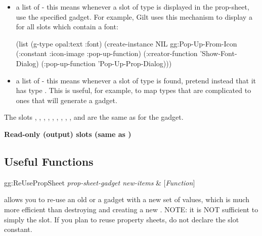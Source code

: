 \begin{description}
\begin{itemize}
\item 
a list of  - this means whenever a slot of type
 is displayed in the prop-sheet, use the specified gadget.
For example, Gilt uses this mechanism to display a
 for all slots which contain a font:
\begin{programexample}
(list (g-type opal:text :font)
      (create-instance NIL gg:Pop-Up-From-Icon
	(:constant :icon-image :pop-up-function)
	(:creator-function 'Show-Font-Dialog)
	(:pop-up-function 'Pop-Up-Prop-Dialog)))
\end{programexample}


\item a list of  - this means whenever a slot of type
 is found, pretend instead that it has type .
This is useful, for example, to map types that are complicated to ones that
will generate a  gadget.
\end{itemize}
\end{description}


The slots , , ,
,
, ,
, ,
, and  are the same as for
the  gadget.

{\bf Read-only (output) slots (same as )}

\begin{description}
\item[] 

\item[] 

\item[] 

\item[] 
\end{description}





\subsection{Useful Functions}

\begin{programexample}
gg:ReUsePropSheet {\it prop-sheet-gadget new-items} & [{\it Function}]
\end{programexample}
 allows you to re-use an old  or a
 gadget with a new set of values, which is much
more efficient than destroying and creating a new .
NOTE: it is NOT sufficient to simply  the  slot.
If you plan to reuse property sheets, do not declare the 
slot constant.

